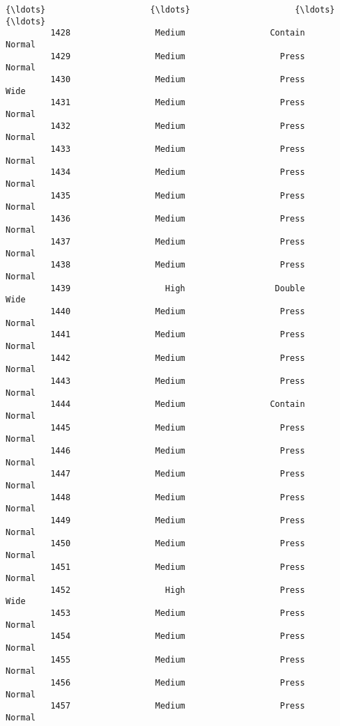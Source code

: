 \documentclass[11pt]{article}
\begin{document}
\begin{Verbatim}[commandchars=\\\{\}]
         {\ldots}                     {\ldots}                     {\ldots}                 {\ldots}   
         1428                 Medium                 Contain              Normal   
         1429                 Medium                   Press              Normal   
         1430                 Medium                   Press                Wide   
         1431                 Medium                   Press              Normal   
         1432                 Medium                   Press              Normal   
         1433                 Medium                   Press              Normal   
         1434                 Medium                   Press              Normal   
         1435                 Medium                   Press              Normal   
         1436                 Medium                   Press              Normal   
         1437                 Medium                   Press              Normal   
         1438                 Medium                   Press              Normal   
         1439                   High                  Double                Wide   
         1440                 Medium                   Press              Normal   
         1441                 Medium                   Press              Normal   
         1442                 Medium                   Press              Normal   
         1443                 Medium                   Press              Normal   
         1444                 Medium                 Contain              Normal   
         1445                 Medium                   Press              Normal   
         1446                 Medium                   Press              Normal   
         1447                 Medium                   Press              Normal   
         1448                 Medium                   Press              Normal   
         1449                 Medium                   Press              Normal   
         1450                 Medium                   Press              Normal   
         1451                 Medium                   Press              Normal   
         1452                   High                   Press                Wide   
         1453                 Medium                   Press              Normal   
         1454                 Medium                   Press              Normal   
         1455                 Medium                   Press              Normal   
         1456                 Medium                   Press              Normal   
         1457                 Medium                   Press              Normal   
         

\end{Verbatim}
\end{document}
